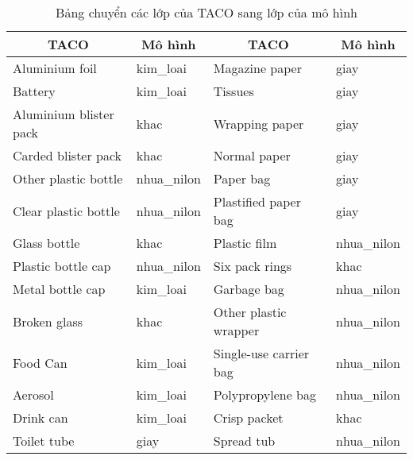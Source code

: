 \documentclass[../the.tex]{subfiles}
\begin{document}
\begin{table}[!h]
	\centering
	\caption{Bảng chuyển các lớp của TACO sang lớp của mô hình}
	\begin{tabular}{|l|l|l|l|}
		\hline
		\multicolumn{1}{|c|}{\textbf{TACO}}
		                       & \multicolumn{1}{c|}{\textbf{Mô hình}}
		                       & \multicolumn{1}{c|}{\textbf{TACO}}
		                       & \multicolumn{1}{c|}{\textbf{Mô hình}}                                           \\
		\hline
		Aluminium foil         & kim\_loai                             & Magazine paper            & giay        \\ \hline
		Battery                & kim\_loai                             & Tissues                   & giay        \\ \hline
		Aluminium blister pack & khac                                  & Wrapping paper            & giay        \\ \hline
		Carded blister pack    & khac                                  & Normal paper              & giay        \\ \hline
		Other plastic bottle   & nhua\_nilon                           & Paper bag                 & giay        \\ \hline
		Clear plastic bottle   & nhua\_nilon                           & Plastified paper bag      & giay        \\ \hline
		Glass bottle           & khac                                  & Plastic film              & nhua\_nilon \\ \hline
		Plastic bottle cap     & nhua\_nilon                           & Six pack rings            & khac        \\ \hline
		Metal bottle cap       & kim\_loai                             & Garbage bag               & nhua\_nilon \\ \hline
		Broken glass           & khac                                  & Other plastic wrapper     & nhua\_nilon \\ \hline
		Food Can               & kim\_loai                             & Single-use carrier bag    & nhua\_nilon \\ \hline
		Aerosol                & kim\_loai                             & Polypropylene bag         & nhua\_nilon \\ \hline
		Drink can              & kim\_loai                             & Crisp packet              & khac        \\ \hline
		Toilet tube            & giay                                  & Spread tub                & nhua\_nilon \\ \hline

\end{tabular}
\end{table}
\end{document}
